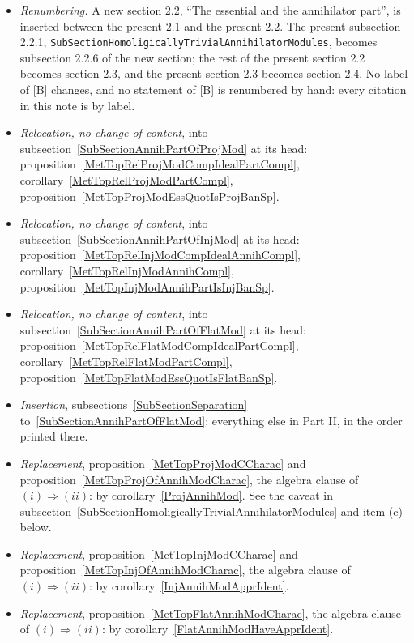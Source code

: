 \documentclass[11pt]{article}
\theoremstyle{plain}
\theoremstyle{definition}
\begin{document}
\begin{itemize}
\item \emph{Renumbering.} A new section 2.2, ``The essential and the annihilator
part'', is inserted between the present 2.1 and the present 2.2. The present
subsection 2.2.1, \texttt{SubSectionHomoligicallyTrivialAnnihilatorModules},
becomes subsection 2.2.6 of the new section; the rest of the present section 2.2
becomes section 2.3, and the present section 2.3 becomes section 2.4. No label of
[B] changes, and no statement of [B] is renumbered by hand: every citation in
this note is by label.

\item \emph{Relocation, no change of content}, into
subsection~\ref{SubSectionAnnihPartOfProjMod} at its head:
proposition~\ref{MetTopRelProjModCompIdealPartCompl},
corollary~\ref{MetTopRelProjModPartCompl},
proposition~\ref{MetTopProjModEssQuotIsProjBanSp}.

\item \emph{Relocation, no change of content}, into
subsection~\ref{SubSectionAnnihPartOfInjMod} at its head:
proposition~\ref{MetTopRelInjModCompIdealAnnihCompl},
corollary~\ref{MetTopRelInjModAnnihCompl},
proposition~\ref{MetTopInjModAnnihPartIsInjBanSp}.

\item \emph{Relocation, no change of content}, into
subsection~\ref{SubSectionAnnihPartOfFlatMod} at its head:
proposition~\ref{MetTopRelFlatModCompIdealPartCompl},
corollary~\ref{MetTopRelFlatModPartCompl},
proposition~\ref{MetTopFlatModEssQuotIsFlatBanSp}.

\item \emph{Insertion}, subsections~\ref{SubSectionSeparation}
to~\ref{SubSectionAnnihPartOfFlatMod}: everything else in Part II, in the order
printed there.

\item \emph{Replacement}, proposition~\ref{MetTopProjModCCharac} and
proposition~\ref{MetTopProjOfAnnihModCharac}, the algebra clause of
$(i)\Rightarrow(ii)$: by corollary~\ref{ProjAnnihMod}. See the caveat in
subsection~\ref{SubSectionHomoligicallyTrivialAnnihilatorModules} and item
(c) below.

\item \emph{Replacement}, proposition~\ref{MetTopInjModCCharac} and
proposition~\ref{MetTopInjOfAnnihModCharac}, the algebra clause of
$(i)\Rightarrow(ii)$: by corollary~\ref{InjAnnihModApprIdent}.

\item \emph{Replacement}, proposition~\ref{MetTopFlatAnnihModCharac}, the algebra
clause of $(i)\Rightarrow(ii)$: by corollary~\ref{FlatAnnihModHaveApprIdent}.


\end{itemize}
\end{document}
